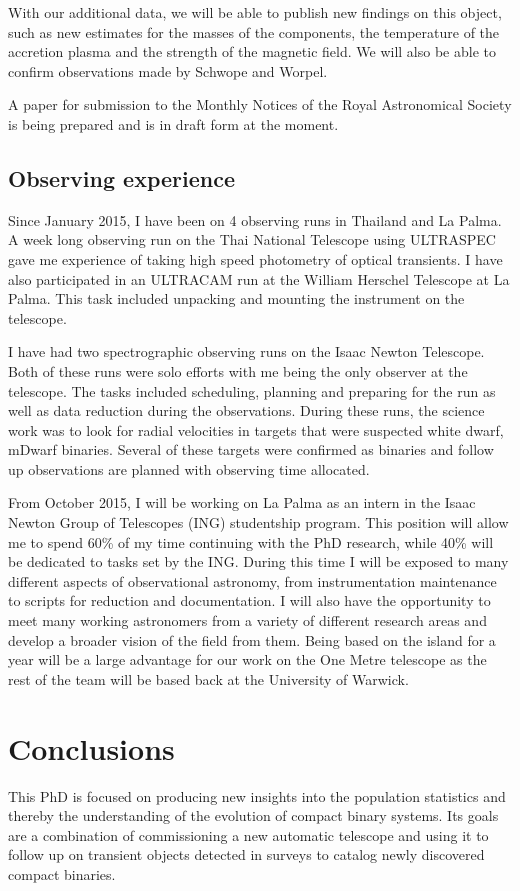 \documentclass[a4paper,fleqn,usenatbib]{mnras}
\begin{document}
With our additional data, we will be able to publish new findings on this object, such as new estimates for the masses of the components, the temperature of the accretion plasma and the strength of the magnetic field. We will also be able to confirm observations made by Schwope and Worpel. 

A paper for submission to the Monthly Notices of the Royal Astronomical Society is being prepared and is in draft form at the moment. 

\subsection{Observing experience}
Since January 2015, I have been on 4 observing runs in Thailand and La Palma. A week long observing run on the Thai National Telescope using ULTRASPEC gave me experience of taking high speed photometry of optical transients. I have also participated in an ULTRACAM run at the William Herschel Telescope at La Palma. This task included unpacking and mounting the instrument on the telescope. 

I have had two spectrographic observing runs on the Isaac Newton Telescope. Both of these runs were solo efforts with me being the only observer at the telescope. The tasks included scheduling, planning and preparing for the run as well as data reduction during the observations. During these runs, the science work was to look for radial velocities in targets that were suspected white dwarf, mDwarf binaries. Several of these targets were confirmed as binaries and follow up observations are planned with observing time allocated.  

From October 2015, I will be working on La Palma as an intern in the Isaac Newton Group of Telescopes (ING) studentship program. This position will allow me to spend 60\% of my time continuing with the PhD research, while 40\% will be dedicated to tasks set by the ING. During this time I will be exposed to many different aspects of observational astronomy, from instrumentation maintenance to scripts for reduction and documentation. I will also have the opportunity to meet many working astronomers from a variety of different research areas and develop a broader vision of the field from them.  Being based on the island for a year will be a large advantage for our work on the One Metre telescope as the rest of the team will be based back at the University of Warwick.  

\section{Conclusions}
This PhD is focused on producing new insights into the population statistics and thereby the understanding of the evolution of compact binary systems. Its goals are a combination of commissioning a new automatic telescope and using it to follow up on transient objects detected in surveys to catalog newly discovered compact binaries. 
\end{document}
